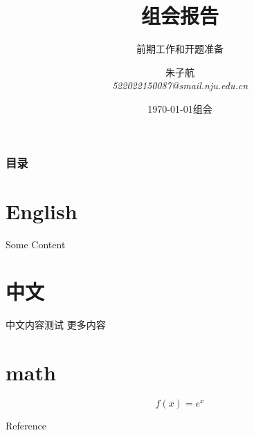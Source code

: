 \documentclass{njupre/njupre}
\title[组会报告]{ 组会报告 }
\subtitle{ 前期工作和开题准备 }
\author[朱子航]{\texorpdfstring{朱子航 \\ \smallskip \textit{522022150087@smail.nju.edu.cn}}{}}
\date[\today]{\texorpdfstring{\today 组会}{}}
\begin{document}
\begin{frame}
    \titlepage
\end{frame}
\begin{frame}
    \frametitle{目录}
    \tableofcontents
\end{frame}

\section{English}
\begin{frame}
    Some Content \cite{arjovskyWassersteinGAN2017}
\end{frame}

\section{中文}
\begin{frame}
    中文内容测试 \pause 更多内容
\end{frame}

\section{math}
\begin{frame}
    $$f(x)=e^x$$
\end{frame}

\begin{frame}[allowframebreaks]{Reference}
    
    
\end{frame}
\end{document}
